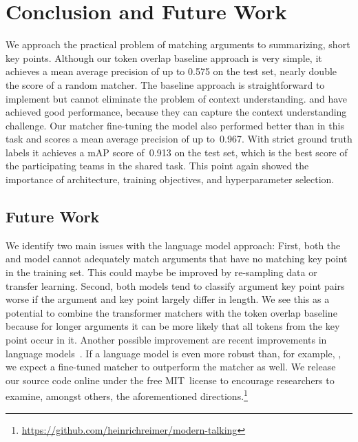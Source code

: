 \section{Conclusion and Future Work}\label{conclusion}

We approach the practical problem of matching arguments to summarizing, short key points.
Although our token overlap baseline approach is very simple, it achieves a mean average precision of up to 0.575 on the test set, nearly double the score of a random matcher. 
The baseline approach is straightforward to implement but cannot eliminate the problem of context understanding. 
\Roberta and \Bert have achieved good performance, because they can capture the context understanding challenge. 
Our matcher fine-tuning the \RobertaBase model also performed better than \Bert in this task and scores a mean average precision of up to~0.967. %
With strict ground truth labels it achieves a mAP score of~0.913 on the test set, which is the best score of the participating teams in the shared task.
This point again showed the importance of architecture, training objectives, and hyperparameter selection.

\subsection{Future Work}

We identify two main issues with the language model approach:
First, both the \BertBase and \RobertaBase model cannot adequately match arguments that have no matching key point in the training set.
This could maybe be improved by re-sampling data or transfer learning.
Second, both models tend to classify argument key point pairs worse if the argument and key point largely differ in length.
We see this as a potential to combine the transformer matchers with the token overlap baseline because for longer arguments it can be more likely that all tokens from the key point occur in it.
Another possible improvement are recent improvements in language models~\cite{Sun2021WFDPSLCZLLWGLSSLOYTWW}.
If a language model is even more robust than, for example, \Roberta, we expect a fine-tuned matcher to outperform the \RobertaBase matcher as well.
We release our source code online under the free MIT~license to encourage researchers to examine, amongst others, the aforementioned directions.\footnote{\url{https://github.com/heinrichreimer/modern-talking}}